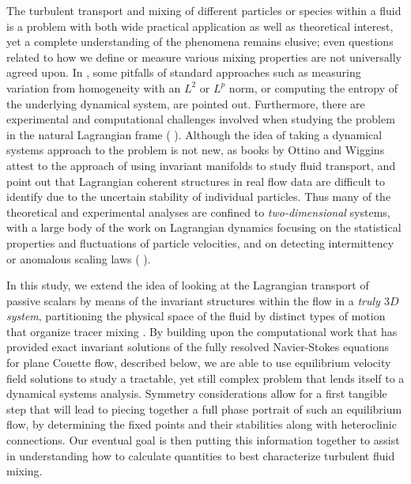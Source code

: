 \documentclass[letter,12pt,openany]{article}
\begin{document}
The turbulent transport and mixing of different particles or species within a fluid is a problem with both wide practical application as well as theoretical interest, yet a complete understanding of the phenomena remains elusive; even questions related to how we define or measure various mixing properties are not universally agreed upon. In \cite{Mathew}, some pitfalls of standard approaches such as measuring variation from homogeneity with an $L^2$ or $L^p$ norm, or computing the entropy of the underlying dynamical system, are pointed out. Furthermore, there are experimental and computational challenges involved when studying the problem in the natural Lagrangian frame (\cite{MHPRS07} \cite{ABBBBB08} \cite{Braun1} \cite{Mordant}). Although the idea of taking a dynamical systems approach to the problem is not new, as books by Ottino \cite{Botti89} and Wiggins \cite{wiggbook} attest to the approach of using invariant manifolds to study fluid transport, \cite{MHPRS07} and \cite{HallerLagrangian} point out that Lagrangian coherent structures in real flow data are difficult to identify due to the uncertain stability of individual particles. Thus many of the theoretical and experimental analyses are confined to \textit{two-dimensional} systems, with a large body of the work on Lagrangian dynamics focusing on the statistical properties and fluctuations of particle velocities, and on detecting intermittency or anomalous scaling laws (\cite{Nzerem} \cite{Mordant} \cite{ABBBBB08} \cite{Falkovich}).

In this study, we extend the idea of looking at the Lagrangian transport of passive scalars by means of the invariant structures within the flow in a \textit{truly $3D$ system}, partitioning the physical space of the fluid by distinct types of motion that organize tracer mixing \cite{HallerLagrangian}. By building upon the computational work that has provided exact invariant solutions of the fully resolved Navier-Stokes equations for plane Couette flow, described below, we are able to use equilibrium velocity field solutions to study a tractable, yet still complex problem that lends itself to a dynamical systems analysis. Symmetry considerations allow for a first tangible step that will lead to piecing together a full phase portrait of such an equilibrium flow, by determining the fixed points and their stabilities along with heteroclinic connections.  Our eventual goal is then putting this information
together to assist in understanding how to calculate quantities to best characterize turbulent fluid mixing.
\end{document}
